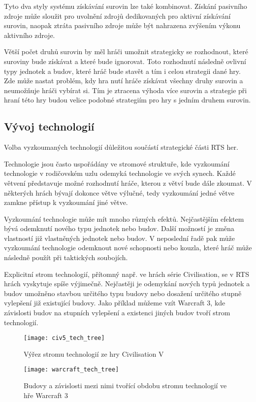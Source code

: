 Tyto dva styly systému získávání surovin lze také kombinovat. Získání pasivního zdroje může sloužit pro uvolnění zdrojů dedikovaných pro aktivní získávání surovin, naopak ztráta pasivního zdroje může být nahrazena zvýšením výkonu aktivního zdroje.


Větší počet druhů surovin by měl hráči umožnit strategicky se rozhodnout, které suroviny bude získávat a které bude ignorovat. Toto rozhodnutí následně ovlivní typy jednotek a budov, které hráč bude stavět a tím i celou strategii dané hry. Zde může nastat problém, kdy hra nutí hráče získávat všechny druhy surovin a neumožňuje hráči vybírat si. Tím je ztracena výhoda více surovin a strategie při hraní této hry budou velice podobné strategiím pro hry s jedním druhem surovin.
\subsection{Vývoj technologií}
Volba vyzkoumaných technologií důležitou součástí strategické části RTS her. 

Technologie jsou často uspořádány ve stromové struktuře, kde vyzkoumání technologie v rodičovském uzlu odemyká technologie ve svých synech. Každé větvení představuje možné rozhodnutí hráče, kterou z větví bude dále zkoumat. V některých hrách bývají dokonce větve výlučné, tedy vyzkoumání jedné větve zamkne přístup k vyzkoumání jiné větve.

Vyzkoumání technologie může mít mnoho různých efektů. Nejčastějším efektem bývá odemknutí nového typu jednotek nebo budov. Další možností je změna vlastností již vlastněných jednotek nebo budov. V neposlední řadě pak může vyzkoumání technologie odemknout nové schopnosti nebo kouzla, které hráč může následně použít při taktických soubojích. 

Explicitní strom technologií, přítomný např. ve hrách série Civilisation, se v RTS hrách vyskytuje spíše výjimečně. Nejčastěji je odemykání nových typů jednotek a budov umožněno stavbou určitého typu budovy nebo dosažení určitého stupně vylepšení již existující budovy. Jako příklad můžeme vzít Warcraft 3, kde závislosti budov na stupních vylepšení a existenci jiných budov tvoří strom technologií. 

\begin{figure}[h]
	\caption{Výřez stromu technologií ze hry Civilisation V}
	\centering
	\texttt{[image: civ5\_tech\_tree]}
\end{figure}


\begin{figure}[h]
\caption{Budovy a závislosti mezi nimi tvořící obdobu stromu technologií ve hře Warcraft 3}
\centering
\texttt{[image: warcraft\_tech\_tree]}
\end{figure}

